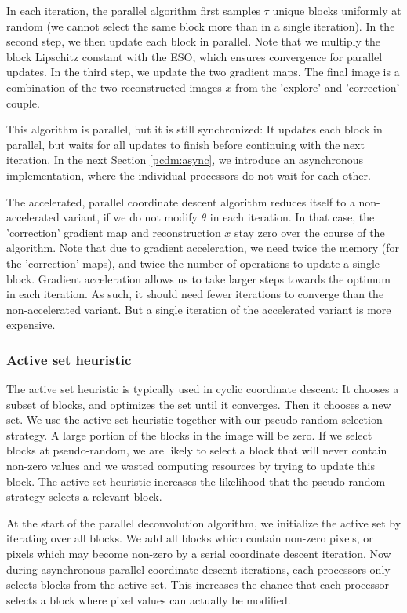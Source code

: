 In each iteration, the parallel algorithm first samples $\tau$ unique blocks uniformly at random (we cannot select the same block more than in a single iteration). In the second step, we then update each block in parallel. Note that we multiply the block Lipschitz constant with the ESO, which ensures convergence for parallel updates. In the third step, we update the two gradient maps. The final image is a combination of the two reconstructed images $x$ from the 'explore' and 'correction' couple.

This algorithm is parallel, but it is still synchronized: It updates each block in parallel, but waits for all updates to finish before continuing with the next iteration. In the next Section \ref{pcdm:async}, we introduce an asynchronous implementation, where the individual processors do not wait for each other.

The accelerated, parallel coordinate descent algorithm reduces itself to a non-accelerated variant, if we do not modify $\theta$ in each iteration. In that case, the 'correction' gradient map and reconstruction $x$ stay zero over the course of the algorithm. Note that due to gradient acceleration, we need twice the memory (for the 'correction' maps), and twice the number of operations to update a single block. Gradient acceleration allows us to take larger steps towards the optimum in each iteration. As such, it should need fewer iterations to converge than the non-accelerated variant. But a single iteration of the accelerated variant is more expensive.

\subsubsection*{Active set heuristic}
The active set heuristic is typically used in cyclic coordinate descent: It chooses a subset of blocks, and optimizes the set until it converges. Then it chooses a  new set. We use the active set heuristic together with our pseudo-random selection strategy. A large portion of the blocks in the image will be zero. If we select blocks at pseudo-random, we are likely to select a block that will never contain non-zero values and we wasted computing resources by trying to update this block. The active set heuristic increases the likelihood that the pseudo-random strategy selects a relevant block. 

At the start of the parallel deconvolution algorithm, we initialize the active set by iterating over all blocks. We add all blocks which contain non-zero pixels, or pixels which may become non-zero by a serial coordinate descent iteration. Now during asynchronous parallel coordinate descent iterations, each processors only selects blocks from the active set. This increases the chance that each processor selects a block where pixel values can actually be modified.

